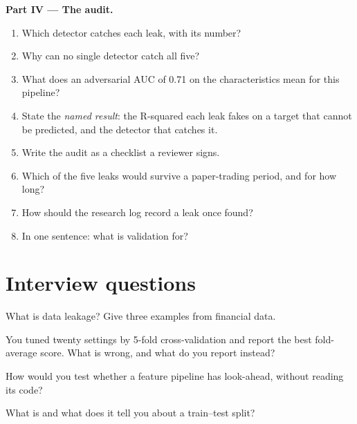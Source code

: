 \begin{problem}
\medskip\noindent\textbf{Part IV --- The audit.}
\begin{enumerate}[resume]
\item Which detector catches each leak, with its number?
\item Why can no single detector catch all five?
\item What does an adversarial AUC of 0.71 on the characteristics mean for this pipeline?
\item State the \emph{named result}: the R-squared each leak fakes on a target that cannot be predicted, and the
detector that catches it.
\item Write the audit as a checklist a reviewer signs.
\item Which of the five leaks would survive a paper-trading period, and for how long?
\item How should the research log record a leak once found?
\item In one sentence: what is validation for?
\end{enumerate}
\end{problem}

\section{Interview questions}

\begin{interviewq}\label{iq:ml:validation:1}
What is data leakage? Give three examples from financial data.
\end{interviewq}

\begin{interviewq}\label{iq:ml:validation:2}
You tuned twenty  settings by 5-fold cross-validation and report the best fold-average score. What is
wrong, and what do you report instead?
\end{interviewq}

\begin{interviewq}\label{iq:ml:validation:3}
How would you test whether a feature pipeline has look-ahead, without reading its code?
\end{interviewq}

\begin{interviewq}\label{iq:ml:validation:4}
What is  and what does it tell you about a train--test split?
\end{interviewq}

